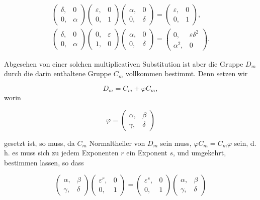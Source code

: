 \[
\begin{gathered}
\begin{pmatrix} \delta, & 0 \\ 0, & \alpha \end{pmatrix}
\begin{pmatrix} \varepsilon, & 0 \\ 0, & 1 \end{pmatrix}
\begin{pmatrix} \alpha, & 0 \\ 0, & \delta \end{pmatrix}
=
\begin{pmatrix} \varepsilon, & 0 \\ 0, & 1 \end{pmatrix},\\[6pt]
\begin{pmatrix} \delta, & 0 \\ 0, & \alpha \end{pmatrix}
\begin{pmatrix} 0, & \varepsilon \\ 1, & 0 \end{pmatrix}
\begin{pmatrix} \alpha, & 0 \\ 0, & \delta \end{pmatrix}
=
\begin{pmatrix} 0, & \varepsilon \delta^2 \\ \alpha^2, & 0 \end{pmatrix}.
\end{gathered}
\]

Abgesehen von einer solchen multiplicativen Substitution ist
aber die Gruppe $D_m$ durch die darin enthaltene Gruppe $C_m$
vollkommen bestimmt. Denn setzen wir

\[
D_m = C_m + \varphi C_m,
\]
worin

\[
\varphi = \begin{pmatrix} \alpha, & \beta \\ \gamma, & \delta \end{pmatrix}
\]

gesetzt ist, so muss, da $C_m$ Normaltheiler von $D_m$ sein muss,
$\varphi C_m = C_m \varphi$ sein, d.\,h. es muss sich zu jedem Exponenten $r$
ein Exponent $s$, und umgekehrt, bestimmen lassen, so dass

\[
\begin{pmatrix} \alpha, & \beta \\ \gamma, & \delta \end{pmatrix}
\begin{pmatrix} \varepsilon^r, & 0 \\ 0, & 1 \end{pmatrix}
=
\begin{pmatrix} \varepsilon^s, & 0 \\ 0, & 1 \end{pmatrix}
\begin{pmatrix} \alpha, & \beta \\ \gamma, & \delta \end{pmatrix}
\]

